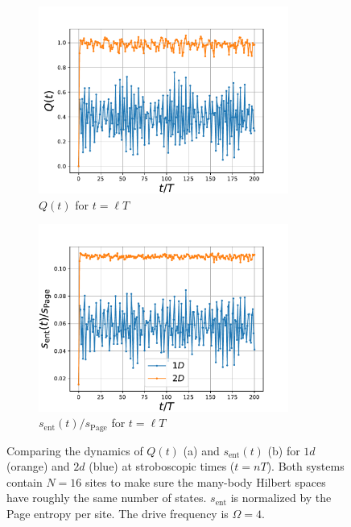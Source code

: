 \documentclass{SciPost}
\newcommand\0{\scalebox{-1}[1]{0}}
\begin{document}
\begin{figure}[t!]
	\begin{subfigure}[a]{0.496\textwidth}
		\includegraphics[width=0.9\textwidth]{TFIM_Q.pdf}
		\caption{$Q(t)$ for $t=\ell T$}
	\end{subfigure}
	\begin{subfigure}[b]{0.496\textwidth}
		\includegraphics[width=0.9\textwidth]{TFIM_S.pdf}
		\caption{$s_\mathrm{ent}(t)/s_\mathrm{Page}$ for $t=\ell T$}
	\end{subfigure}
	\caption{\label{fig:example9} Comparing the dynamics of $Q(t)$ (a) and $s_\mathrm{ent}(t)$ (b) for $1d$ (orange) and $2d$ (blue) at stroboscopic times ($t=nT$). Both systems contain $N=16$ sites to make sure the many-body Hilbert spaces have roughly the same number of states. $s_\mathrm{ent}$ is normalized by the Page entropy per site. The drive frequency is $\Omega=4$.}
\end{figure}
\end{document}
